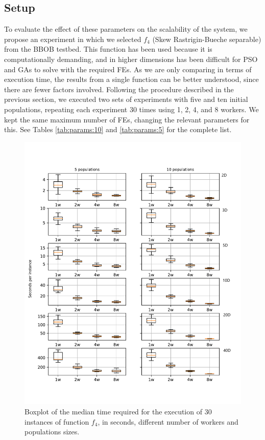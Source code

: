 \documentclass[review]{elsarticle}
\begin{document}
\subsection{Setup}

To evaluate the effect of these parameters on the scalability of the system, we
propose  an experiment in which we selected $f_4$ (Skew Rastrigin-Bueche separable) from the
BBOB testbed. This function has been used because it is computationally demanding,
and in higher dimensions has been difficult for PSO \cite{el2009black} and GAs
\cite{nicolau2009application} to solve with the required FEs. As we
are only comparing in terms of execution time, the results from a single function
can be better understood, since there are fewer factors involved.
Following the procedure described in the previous section, we executed 
two sets of experiments with five and ten initial populations,
repeating each experiment 30 times using  1, 2, 4, and 8 workers.  We kept the same 
maximum number of FEs, changing the relevant parameters for this. 
See Tables \ref{tab:params:10} and \ref{tab:params:5} 
for the complete list. 
%
\begin{figure}[h!tbp]
  \centering
  \includegraphics[width=\textwidth]{time_diff}
  \caption{Boxplot of the median time required for the execution of 30 
  instances of function $f_4$, in seconds, different number of workers and populations sizes.  }
  \label{fig:spworker}
\end{figure}
\end{document}

